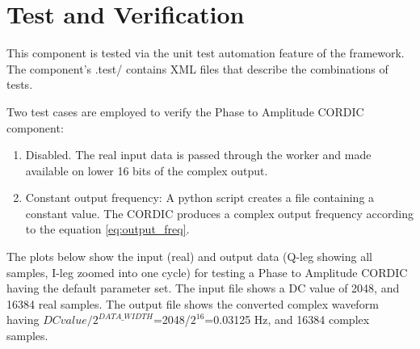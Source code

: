 \documentclass{article}
\begin{document}
\section*{Test and Verification}
This component is tested via the unit test automation feature of the framework.  The component's .test/ contains XML files that describe the combinations of tests.\medskip

Two test cases are employed to verify the Phase to Amplitude CORDIC component:

\begin{enumerate}
	\item Disabled. The real input data is passed through the worker and made available on lower 16 bits of the complex output.
	\item Constant output frequency: A python script creates a file containing a constant value. The CORDIC produces a complex output frequency according to the equation \ref{eq:output_freq}.
\end{enumerate}

The plots below show the input (real) and output data (Q-leg showing all samples, I-leg zoomed into one cycle) for testing a Phase to Amplitude CORDIC having the default parameter set. The input file shows a DC value of 2048, and 16384 real samples.  The output file shows the converted complex waveform having $DC value/2^{DATA\_WIDTH}$=2048/$2^{16}$=0.03125 Hz, and 16384 complex samples.
\end{document}
